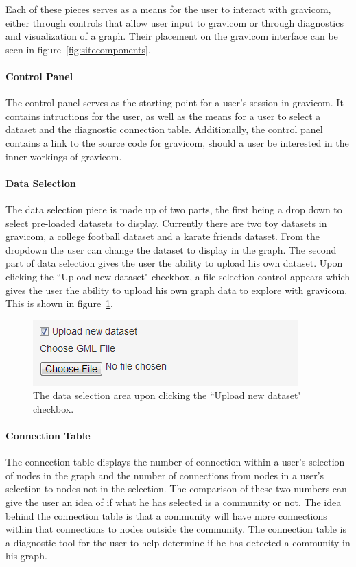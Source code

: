 \documentclass{article}\usepackage[]{graphicx}\usepackage[]{color}
\begin{document}
Each of these pieces serves as a means for the user to interact with gravicom, either through controls that allow user input to gravicom or through diagnostics and visualization of a graph. Their placement on the gravicom interface can be seen in figure~\ref{fig:sitecomponents}.

\paragraph{Control Panel}
The control panel serves as the starting point for a user's session in gravicom. It contains intructions for the user, as well as the means for a user to select a dataset and the diagnostic connection table. Additionally, the control panel contains a link to the source code for gravicom, should a user be interested in the inner workings of gravicom.

\paragraph{Data Selection}
The data selection piece is made up of two parts, the first being a drop down to select pre-loaded datasets to display. Currently there are two toy datasets in gravicom, a college football dataset and a karate friends dataset. From the dropdown the user can change the dataset to display in the graph. The second part of data selection gives the user the ability to upload his own dataset. Upon clicking the ``Upload new dataset" checkbox, a file selection control appears which gives the user the ability to upload his own graph data to explore with gravicom. This is shown in figure~\ref{fig:uploadnewdataset}.

\begin{figure}[hbtp]
\centering
\includegraphics[]{images/uploadnewdataset.png}
\caption{\label{fig:uploadnewdataset} The data selection area upon clicking the ``Upload new dataset" checkbox.}
\end{figure}

\paragraph{Connection Table}
The connection table displays the number of connection within a user's selection of nodes in the graph and the number of connections from nodes in a user's selection to nodes not in the selection. The comparison of these two numbers can give the user an idea of if what he has selected is a community or not. The idea behind the connection table is that a community will have more connections within that connections to nodes outside the community. The connection table is a diagnostic tool for the user to help determine if he has detected a community in his graph. 
\end{document}
